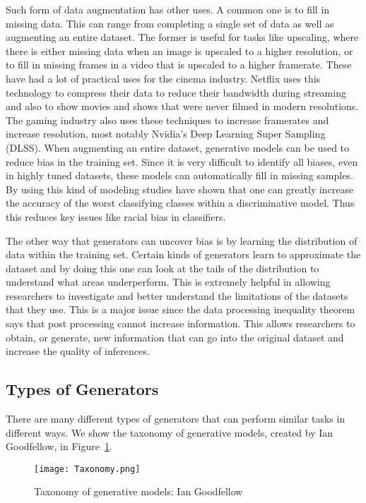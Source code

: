 Such form of data augmentation has other uses. A common one is to fill in
missing data. This can range from completing a single set of data as well as
augmenting an entire dataset. The former is useful for tasks like upscaling,
where there is either missing data when an image is upscaled to a higher
resolution, or to fill in missing frames in a video that is upscaled to
a higher framerate. These have had a lot of practical uses for the cinema
industry. Netflix uses this technology to compress their data to reduce their
bandwidth during streaming and also to show movies and shows that were never
filmed in modern resolutions. The gaming industry also uses these techniques to
increase framerates and increase resolution, most notably Nvidia's Deep Learning
Super Sampling (DLSS). When augmenting an entire dataset, generative
models can be used to reduce bias in the training set. Since it is very
difficult to identify all biases, even in highly tuned datasets, these models
can automatically fill in missing samples. By using this kind of modeling
studies have shown that one can greatly increase the accuracy of the worst
classifying classes within a discriminative model. Thus this reduces key issues
like racial bias in classifiers. 

The other way that generators can uncover bias is by learning the distribution
of data within the training set. Certain kinds of generators learn to
approximate the dataset and by doing this one can look at the tails of the
distribution to understand what areas underperform. This is extremely helpful in
allowing researchers to investigate and better understand the limitations of the
datasets that they use. This is a major issue since the data processing
inequality theorem says that post processing cannot increase information. This
allows researchers to obtain, or generate, new information that can go into the
original dataset and increase the quality of inferences.

\subsection{Types of Generators}
There are many different types of generators that can perform similar tasks in
different ways. We show the taxonomy of generative models, created by Ian
Goodfellow, in Figure~\ref{fig:tax}. 

\begin{figure}[ht]
\centering
\texttt{[image: Taxonomy.png]}
\caption{Taxonomy of generative models: Ian Goodfellow}
\label{fig:tax}
\end{figure}

